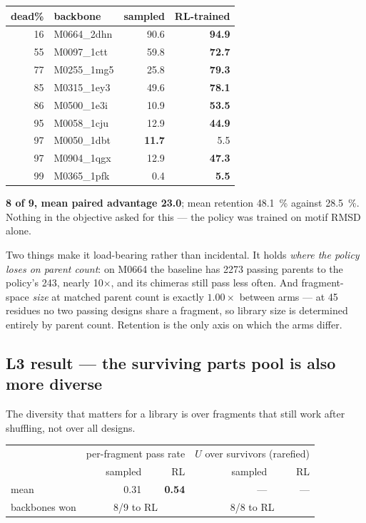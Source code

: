 \begin{center}
\begin{tabular}{rlrr}
\toprule
dead\% & backbone & sampled & RL-trained \\
\midrule
16 & M0664\_2dhn & 90.6 & \textbf{94.9} \\
55 & M0097\_1ctt & 59.8 & \textbf{72.7} \\
77 & M0255\_1mg5 & 25.8 & \textbf{79.3} \\
85 & M0315\_1ey3 & 49.6 & \textbf{78.1} \\
86 & M0500\_1e3i & 10.9 & \textbf{53.5} \\
95 & M0058\_1cju & 12.9 & \textbf{44.9} \\
97 & M0050\_1dbt & \textbf{11.7} & 5.5 \\
97 & M0904\_1qgx & 12.9 & \textbf{47.3} \\
99 & M0365\_1pfk & 0.4 & \textbf{5.5} \\
\bottomrule
\end{tabular}
\end{center}

\textbf{8 of 9, mean paired advantage \SI{+23.0}{\points}}; mean retention
\SI{48.1}{\percent} against \SI{28.5}{\percent}. Nothing in the objective asked
for this --- the policy was trained on motif RMSD alone.

Two things make it load-bearing rather than incidental. It holds \emph{where the
policy loses on parent count}: on M0664 the baseline has \num{2273} passing
parents to the policy's 243, nearly \num{10}$\times$, and its chimeras still
pass less often. And fragment-space \emph{size} at matched parent count is
exactly $1.00\times$ between arms --- at 45 residues no two passing designs
share a fragment, so library size is determined entirely by parent count.
Retention is the only axis on which the arms differ.

\subsection*{L3 result --- the surviving parts pool is also more diverse}

The diversity that matters for a library is over fragments that still work after
shuffling, not over all designs.

\begin{center}
\begin{tabular}{lrrrr}
\toprule
 & \multicolumn{2}{c}{per-fragment pass rate} & \multicolumn{2}{c}{$U$ over survivors (rarefied)} \\
 & sampled & RL & sampled & RL \\
\midrule
mean & 0.31 & \textbf{0.54} & --- & --- \\
backbones won & \multicolumn{2}{c}{8/9 to RL} & \multicolumn{2}{c}{8/8 to RL} \\
\bottomrule
\end{tabular}
\end{center}

